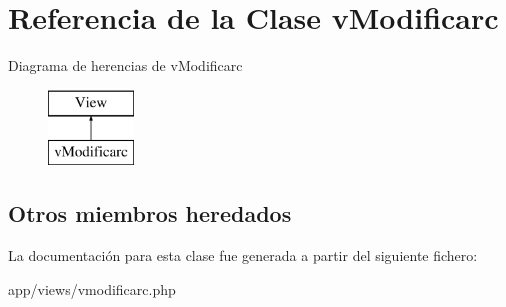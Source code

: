 \hypertarget{classv_modificarc}{}\section{Referencia de la Clase v\+Modificarc}
\label{classv_modificarc}
Diagrama de herencias de v\+Modificarc\begin{figure}[H]
\begin{center}
\leavevmode
\includegraphics[height=2.000000cm]{classv_modificarc}
\end{center}
\end{figure}
\subsection*{Otros miembros heredados}


La documentación para esta clase fue generada a partir del siguiente fichero\+:\begin{DoxyCompactItemize}
\item 
app/views/vmodificarc.\+php\end{DoxyCompactItemize}
